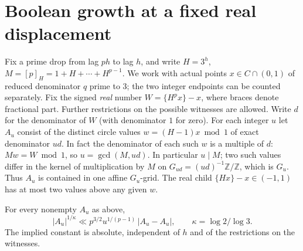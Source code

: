\section{Boolean growth at a fixed real displacement}\label{sec:boolean}

Fix a prime drop from lag \(ph\) to lag \(h\), and write \(H=3^h\),
\(M=[p]_H=1+H+\cdots+H^{p-1}\). We work with actual points
\(x\in C\cap(0,1)\) of reduced denominator \(q\) prime to \(3\);
the two integer endpoints can be counted separately. Fix the signed
\emph{real} number \(W=\{H^p x\}-x\), where braces denote fractional
part. Further restrictions on the possible witnesses are allowed.
Write \(d\) for the denominator of \(W\) (with denominator \(1\) for
zero). For each integer \(u\) let \(A_u\) consist of the distinct
circle values \(w=(H-1)x\bmod 1\) of exact denominator \(ud\).
In fact the denominator of each such \(w\) is a multiple of \(d\):
\(Mw=W\bmod 1\), so \(u=\gcd(M,ud)\). In particular \(u\mid M\);
two such values differ in the kernel of multiplication by \(M\) on
\(G_{ud}=(ud)^{-1}\mathbb Z/\mathbb Z\), which is \(G_u\). Thus
\(A_u\) is contained in one affine \(G_u\)-grid. The real child
\(\{Hx\}-x\in(-1,1)\) has at most two values above any given \(w\).

\begin{proposition}\label{prop:bool-winding}
For every nonempty \(A_u\) as above,
\[
 |A_u|^{1/\kappa}
   \ll p^{3/2}u^{1/(p-1)}\,|A_u-A_u|,
 \qquad \kappa=\log 2/\log 3.
\]
The implied constant is absolute, independent of \(h\) and of the
restrictions on the witnesses.
\end{proposition}

